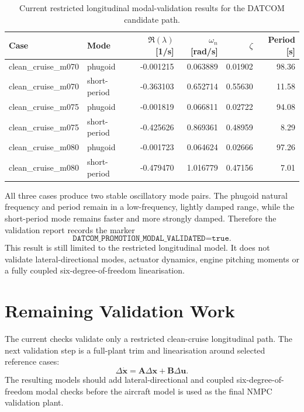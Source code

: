 \begin{table}[H]
    \centering
    \caption{Current restricted longitudinal modal-validation results for the DATCOM candidate path.}
    \label{tab:longitudinal_modal_validation_results}
    \begin{tabular}{llrrrr}
        \toprule
        Case & Mode & $\Re(\lambda)$ [1/s] & $\omega_n$ [rad/s] & $\zeta$ & Period [s] \\
        \midrule
        clean\_cruise\_m070 & phugoid & -0.001215 & 0.063889 & 0.01902 & 98.36 \\
        clean\_cruise\_m070 & short-period & -0.363103 & 0.652714 & 0.55630 & 11.58 \\
        clean\_cruise\_m075 & phugoid & -0.001819 & 0.066811 & 0.02722 & 94.08 \\
        clean\_cruise\_m075 & short-period & -0.425626 & 0.869361 & 0.48959 & 8.29 \\
        clean\_cruise\_m080 & phugoid & -0.001723 & 0.064624 & 0.02666 & 97.26 \\
        clean\_cruise\_m080 & short-period & -0.479470 & 1.016779 & 0.47156 & 7.01 \\
        \bottomrule
    \end{tabular}
\end{table}

All three cases produce two stable oscillatory mode pairs. The phugoid natural frequency and period remain in a low-frequency, lightly damped range, while the short-period mode remains faster and more strongly damped. Therefore the validation report records the marker
\begin{equation}
    \texttt{DATCOM\_PROMOTION\_MODAL\_VALIDATED=true}.
\end{equation}
This result is still limited to the restricted longitudinal model. It does not validate lateral-directional modes, actuator dynamics, engine pitching moments or a fully coupled six-degree-of-freedom linearisation.

\section{Remaining Validation Work}

The current checks validate only a restricted clean-cruise longitudinal path.
The next validation step is a full-plant trim and linearisation around selected
reference cases:
\begin{equation}
    \Delta\dot{\bm{x}} = \bm{A}\Delta\bm{x} + \bm{B}\Delta\bm{u}.
\end{equation}
The resulting models should add lateral-directional and coupled
six-degree-of-freedom modal checks before the aircraft model is used as the
final NMPC validation plant.
